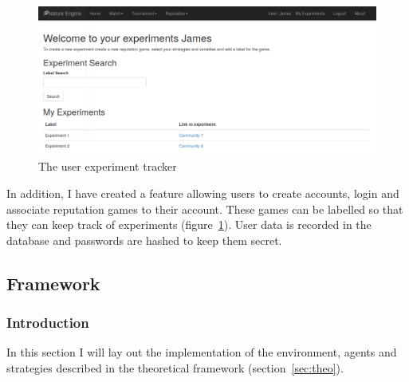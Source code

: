 \documentclass[]{final_report}
\begin{document}
\begin{figure}
\begin{framed}
	\begin{center}
	\includegraphics[width=\textwidth]{UserExperiments.png}
	\caption{The user experiment tracker}
	\label{fig:user_experiments}
	\end{center}
\end{framed}
\end{figure}
In addition, I have created a feature allowing users to create accounts, login and associate reputation games to their account. These games can be labelled so that they can keep track of experiments (figure~\ref{fig:user_experiments}). User data is recorded in the database and passwords are hashed to keep them secret.

\subsection{Framework}
\subsubsection{Introduction}
In this section I will lay out the implementation of the environment, agents and strategies described in the theoretical framework (section~\ref{sec:theo}). 
\end{document}
